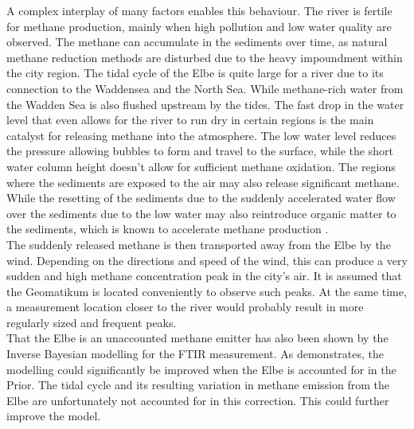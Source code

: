A complex interplay of many factors enables this behaviour. The river is fertile for methane production, mainly when high pollution and low water quality are observed. The methane can accumulate in the sediments over time, as natural methane reduction methods are disturbed due to the heavy impoundment within the city region. The tidal cycle of the Elbe is quite large for a river due to its connection to the Waddensea and the North Sea. While methane-rich water from the Wadden Sea is also flushed upstream by the tides. The fast drop in the water level that even allows for the river to run dry in certain regions is the main catalyst for releasing methane into the atmosphere. The low water level reduces the pressure allowing bubbles to form and travel to the surface, while the short water column height doesn’t allow for sufficient methane oxidation. The regions where the sediments are exposed to the air may also release significant methane. While the resetting of the sediments due to the suddenly accelerated water flow over the sediments due to the low water may also reintroduce organic matter to the sediments, which is known to accelerate methane production \cite{Bednarik.2019}. \\
The suddenly released methane is then transported away from the Elbe by the wind. Depending on the directions and speed of the wind, this can produce a very sudden and high methane concentration peak in the city's air. It is assumed that the Geomatikum is located conveniently to observe such peaks. At the same time, a measurement location closer to the river would probably result in more regularly sized and frequent peaks.\\
That the  Elbe is an unaccounted methane emitter has also been shown by the Inverse Bayesian modelling for the FTIR measurement. As \cite{Forstmaier.2023} demonstrates, the modelling could significantly be improved when the Elbe is accounted for in the Prior. The tidal cycle and its resulting variation in methane emission from the Elbe are unfortunately not accounted for in this correction. This could further improve the model.

